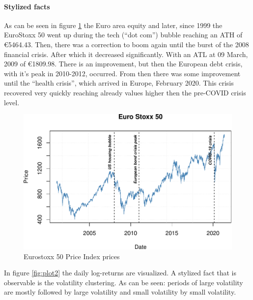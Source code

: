 \documentclass[a4paper, twoside]{templates/ociamthesis}
\begin{document}
\hypertarget{stylized-facts}{%
\paragraph{\texorpdfstring{Stylized facts ~\\
}{Stylized facts ~ }}\label{stylized-facts}}

As can be seen in figure \ref{fig:plot1} the Euro area equity and later, since 1999 the EuroStoxx 50 went up during the tech (``dot com'') bubble reaching an ATH of €5464.43. Then, there was a correction to boom again until the burst of the 2008 financial crisis. After which it decreased significantly. With an ATL at 09 March, 2009 of €1809.98. There is an improvement, but then the European debt crisis, with it's peak in 2010-2012, occurred. From then there was some improvement until the ``health crisis'', which arrived in Europe, February 2020. This crisis recovered very quickly reaching already values higher then the pre-COVID crisis level.

\begin{figure}[h]

{\centering \includegraphics[width=1\linewidth]{_main_files/figure-latex/plot1-1} 

}

\caption{Eurostoxx 50 Price Index prices}\label{fig:plot1}
\end{figure}

\newpage

In figure \ref{fig:plot2} the daily log-returns are visualized. A stylized fact that is observable is the volatility clustering. As can be seen: periods of large volatility are mostly followed by large volatility and small volatility by small volatility.
\end{document}
